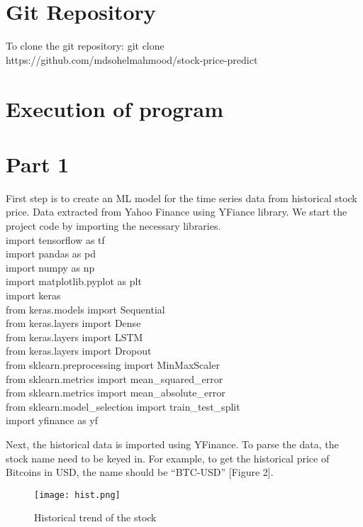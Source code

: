 \documentclass[11pt]{diazessay} %
\begin{document}
\section{Git Repository}
To clone the git repository: 
{\selectfont
git clone https://github.com/mdsohelmahmood/stock-price-predict
}

\section{Execution of program}
\section*{Part 1}

First step is to create an ML model for the time series data from historical stock price. Data extracted from Yahoo Finance using YFiance library.
We start the project code by importing the necessary libraries.\\

{\selectfont
\noindent import tensorflow as tf\\
import pandas as pd\\
import numpy as np\\
import matplotlib.pyplot as plt\\
import keras\\
from keras.models import Sequential\\
from keras.layers import Dense\\
from keras.layers import LSTM\\
from keras.layers import Dropout\\
from sklearn.preprocessing import MinMaxScaler\\
from sklearn.metrics import mean\_squared\_error\\
from sklearn.metrics import mean\_absolute\_error\\
from sklearn.model\_selection import train\_test\_split\\
import yfinance as yf\\
}

Next, the historical data is imported using YFinance. To parse the data, the stock name need to be keyed in. For example, to get the historical price of Bitcoins in USD, the name should be “BTC-USD” [Figure 2].\\

\begin{figure}[!h]
\begin{center}
\texttt{[image: hist.png]} %
\caption{Historical trend of the stock}
\end{center}
\end{figure}
\end{document}

